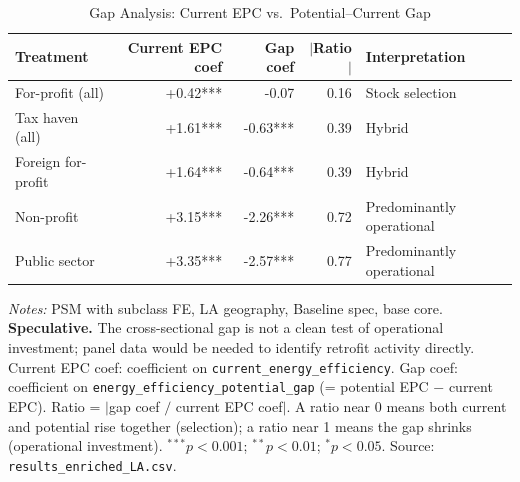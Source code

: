 \begin{table}[htbp]
\centering
\caption{Gap Analysis: Current EPC vs.\ Potential--Current Gap}
\label{tab:gap_analysis}
\begin{tabular}{lrrrl}
\toprule
Treatment & Current EPC coef & Gap coef & $|$Ratio$|$ & Interpretation \\
\midrule
For-profit (all) & +0.42*** & -0.07 & 0.16 & Stock selection \\
Tax haven (all) & +1.61*** & -0.63*** & 0.39 & Hybrid \\
Foreign for-profit & +1.64*** & -0.64*** & 0.39 & Hybrid \\
Non-profit & +3.15*** & -2.26*** & 0.72 & Predominantly operational \\
Public sector & +3.35*** & -2.57*** & 0.77 & Predominantly operational \\
\bottomrule
\end{tabular}
\begin{minipage}{0.9\textwidth}
\vspace{4pt}
\footnotesize
\textit{Notes:} PSM with subclass FE, LA geography, Baseline spec, base core.
\textbf{Speculative.} The cross-sectional gap is not a clean test of operational
investment; panel data would be needed to identify retrofit activity directly.
Current EPC coef: coefficient on \texttt{current\_energy\_efficiency}.
Gap coef: coefficient on \texttt{energy\_efficiency\_potential\_gap} (= potential EPC $-$ current EPC).
Ratio = $|$gap coef $/$ current EPC coef$|$.
A ratio near 0 means both current and potential rise together (selection);
a ratio near 1 means the gap shrinks (operational investment).
$^{***}p<0.001$; $^{**}p<0.01$; $^{*}p<0.05$.
Source: \texttt{results\_enriched\_LA.csv}.
\end{minipage}
\end{table}
